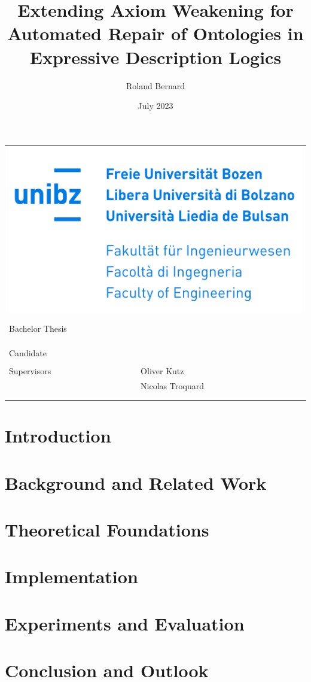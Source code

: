 \documentclass[10pt,a4paper]{report}
\title{Extending Axiom Weakening for Automated Repair of Ontologies in Expressive Description Logics}
\author{Roland Bernard}
\date{July 2023}
\makeatletter
\theoremstyle{plain}
\theoremstyle{definition}
\theoremstyle{remark}
\def\maketitle{
    \begin{tabular}{ll}
        \multicolumn{2}{r}{\includegraphics[width=0.5\linewidth]{resources/unibz-logo.png}} \\
        \vspace*{40mm} \\
        \multicolumn{2}{l}{\raggedright Bachelor Thesis} \\
        \vspace*{1mm} \\
        \multicolumn{2}{p{\linewidth}}{\raggedright \huge \bf \@title} \\
        \vspace*{30mm} \\
        Candidate   & \@author \\
        \vspace*{5mm} \\
        Supervisors & Oliver Kutz \\
                    & Nicolas Troquard \\
        \vspace*{20mm} \\
        \multicolumn{2}{p{\linewidth}}{\@date}
    \end{tabular}
}
\makeatother
\begin{document}
\maketitle

\begin{abstract}
    
\end{abstract}

\tableofcontents

\begingroup
\renewcommand{\abstractname}{Acknowledgements}
\begin{abstract}
    
\end{abstract}
\endgroup

\chapter{Introduction} \label{introduction}



\chapter{Background and Related Work} \label{background}



\chapter{Theoretical Foundations} \label{theory}



\chapter{Implementation} \label{implementation}



\chapter{Experiments and Evaluation} \label{evaluation}



\chapter{Conclusion and Outlook} \label{conclusion}
\end{document}

